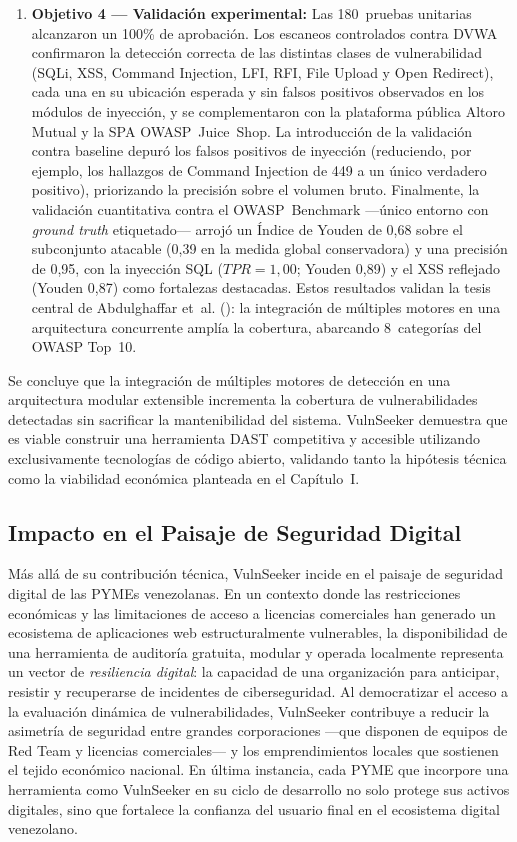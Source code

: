 \documentclass[12pt, a4paper]{article}
\begin{document}
\begin{enumerate}
    \item \textbf{Objetivo 4 — Validación experimental:} Las 180~pruebas
    unitarias alcanzaron un 100\% de aprobación. Los escaneos controlados
    contra DVWA confirmaron la detección correcta de las distintas clases de
    vulnerabilidad (SQLi, XSS, Command Injection, LFI, RFI, File Upload y Open
    Redirect), cada una en su ubicación esperada y sin falsos positivos
    observados en los módulos de inyección, y se complementaron con la plataforma
    pública Altoro Mutual y la SPA OWASP~Juice~Shop. La introducción de
    la validación contra baseline depuró los falsos positivos de inyección
    (reduciendo, por ejemplo, los hallazgos de Command Injection de 449 a un
    único verdadero positivo), priorizando la precisión sobre el volumen bruto.
    Finalmente, la validación cuantitativa contra el OWASP~Benchmark ---único
    entorno con \textit{ground truth} etiquetado--- arrojó un Índice de Youden de
    0,68 sobre el subconjunto atacable (0,39 en la medida global conservadora) y
    una precisión de 0,95, con la inyección SQL ($TPR = 1{,}00$; Youden 0,89) y el
    XSS reflejado (Youden 0,87) como fortalezas destacadas. Estos resultados validan la tesis central de
    Abdulghaffar et~al. (\citeyear*{abdulghaffar2023}): la integración de
    múltiples motores en una arquitectura concurrente amplía la cobertura,
    abarcando 8~categorías del OWASP Top~10.
\end{enumerate}

Se concluye que la integración de múltiples motores de detección en una
arquitectura modular extensible incrementa la cobertura de vulnerabilidades
detectadas sin sacrificar la mantenibilidad del sistema. VulnSeeker demuestra
que es viable construir una herramienta DAST competitiva y accesible
utilizando exclusivamente tecnologías de código abierto, validando tanto la
hipótesis técnica como la viabilidad económica planteada en el Capítulo~I.

\subsection{Impacto en el Paisaje de Seguridad Digital}

Más allá de su contribución técnica, VulnSeeker incide en el paisaje de
seguridad digital de las PYMEs venezolanas. En un contexto donde las
restricciones económicas y las limitaciones de acceso a licencias comerciales
han generado un ecosistema de aplicaciones web estructuralmente vulnerables,
la disponibilidad de una herramienta de auditoría gratuita, modular y operada
localmente representa un vector de \textit{resiliencia digital}: la capacidad
de una organización para anticipar, resistir y recuperarse de incidentes de
ciberseguridad. Al democratizar el acceso a la evaluación dinámica de
vulnerabilidades, VulnSeeker contribuye a reducir la asimetría de seguridad
entre grandes corporaciones ---que disponen de equipos de Red Team y licencias
comerciales--- y los emprendimientos locales que sostienen el tejido económico
nacional. En última instancia, cada PYME que incorpore una herramienta como
VulnSeeker en su ciclo de desarrollo no solo protege sus activos digitales,
sino que fortalece la confianza del usuario final en el ecosistema digital
venezolano.
\end{document}
